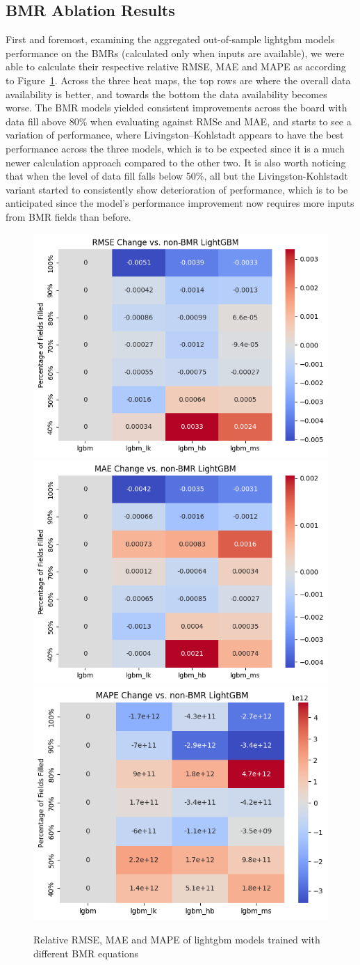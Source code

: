 \subsection{BMR Ablation Results}
First and foremost, examining the aggregated out-of-sample lightgbm models performance on the BMRs (calculated only when inputs are available), we were able to calculate their respective relative RMSE, MAE and MAPE as according to Figure~\ref{fig:lightgbm-bmrs}. Across the three heat maps, the top rows are where the overall data availability is better, and towards the bottom the data availability becomes worse. The BMR models yielded consistent improvements across the board with data fill above 80\% when evaluating against RMSe and MAE, and starts to see a variation of performance, where Livingston–Kohlstadt appears to have the best performance across the three models, which is to be expected since it is a much newer calculation approach compared to the other two. It is also worth noticing that when the level of data fill falls below 50\%, all but the Livingston-Kohlstadt variant started to consistently show deterioration of performance, which is to be anticipated since the model's performance improvement now requires more inputs from BMR fields than before. %
\begin{figure}[h!]
    \centering
    \includegraphics[width=0.3\linewidth]{fig/lgbrmse.png}
    \includegraphics[width=0.3\linewidth]{fig/lgbmae.png}
    \includegraphics[width=0.3\linewidth]{fig/lgbmape.png}
    \caption{Relative RMSE, MAE and MAPE of lightgbm models trained with different BMR equations}
    \label{fig:lightgbm-bmrs}
\end{figure}

